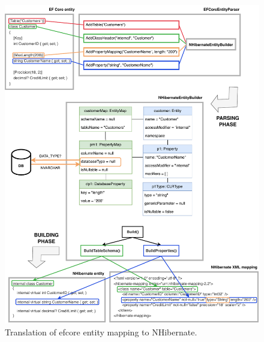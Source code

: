\begin{figure}[H]
  \centering
  \includegraphics[width=\textwidth]{thesis/img/thesis/04_parsing_building.drawio.pdf}
  \caption{Translation of \acrshort{efcore} entity mapping to NHibernate.}
  \label{fig:abstract_ir}
\end{figure}
